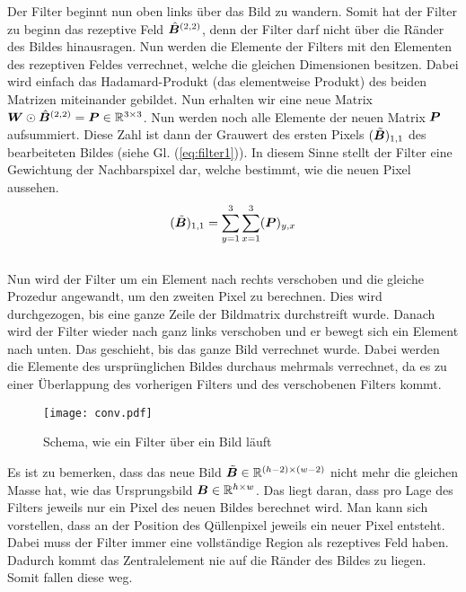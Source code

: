 \para{}
Der Filter beginnt nun oben links über das Bild zu wandern. Somit
hat der Filter zu beginn das rezeptive Feld $\hat{\bm{B}}^{(2,2)}$, denn der
Filter darf nicht über die Ränder des Bildes hinausragen.
Nun werden die Elemente der Filters mit den Elementen des rezeptiven Feldes
verrechnet, welche die gleichen Dimensionen besitzen. Dabei wird einfach das
Hadamard-Produkt (das elementweise Produkt) des beiden Matrizen miteinander
gebildet. Nun erhalten wir eine neue Matrix $\bm{W} \odot
\hat{\bm{B}}^{(2,2)} = \bm{P} \in \mathbb{R}^{3 \times 3}$.
Nun werden noch alle Elemente der neuen Matrix $\bm{P}$
aufsummiert. Diese Zahl ist dann der Grauwert des ersten Pixels $(\tilde{\bm{B}})_{1,1}$ des bearbeiteten
Bildes (siehe Gl. (\ref{eq:filter1})). In diesem Sinne stellt der Filter eine Gewichtung der Nachbarspixel dar, welche
bestimmt, wie die neuen Pixel aussehen.
\\
\begin{equation}\label{eq:filter1}
  (\tilde{\bm{B}})_{1,1} = \sum_{y=1}^3 \sum_{x=1}^3 (\bm{P})_{y,x}
\end{equation}
\\
Nun wird der Filter um ein Element nach rechts verschoben und die gleiche
Prozedur angewandt, um den zweiten Pixel zu berechnen. Dies
wird durchgezogen, bis eine ganze Zeile der Bildmatrix durchstreift wurde.
Danach wird der Filter wieder nach ganz links verschoben und er bewegt sich ein
Element nach unten. Das geschieht, bis das ganze Bild verrechnet wurde.
Dabei werden die Elemente des ursprünglichen Bildes durchaus mehrmals
verrechnet, da es zu einer Überlappung des vorherigen Filters und des
verschobenen Filters kommt.
\para{}

\ifcp
\begin{figure}[h!]
  \centering
  \texttt{[image: conv.pdf]}
  \caption{Schema, wie ein Filter über ein Bild läuft}
\end{figure}
\fi

Es ist zu bemerken, dass das neue Bild $\tilde{\bm{B}} \in \mathbb{R}^{(h-2) \times (w-2)}$ nicht mehr die gleichen Masse
hat, wie das Ursprungsbild $\bm{B} \in \mathbb{R}^{h \times w}$. Das liegt daran, dass pro
Lage des Filters jeweils nur ein Pixel des neuen Bildes berechnet wird. Man kann
sich vorstellen, dass an der Position des Qüllenpixel jeweils ein neuer
Pixel entsteht. Dabei muss der Filter immer eine vollständige Region als
rezeptives Feld haben. Dadurch kommt das Zentralelement nie auf die Ränder des
Bildes zu liegen. Somit fallen diese weg.
\para{}
\cite{deeplearning.ai:cnn}
\cite{wiki:convolution}

